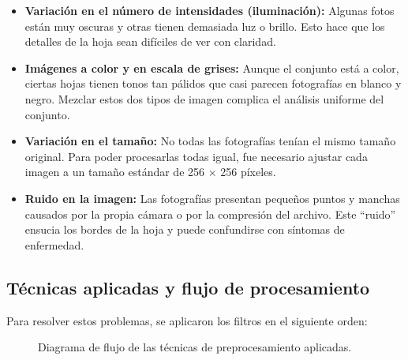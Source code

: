 \documentclass[11pt,a4paper]{article}
\begin{document}
\begin{itemize}
    \item \textbf{Variación en el número de intensidades (iluminación):} Algunas fotos
    están muy oscuras y otras tienen demasiada luz o brillo. Esto hace que los detalles
    de la hoja sean difíciles de ver con claridad.

    \item \textbf{Imágenes a color y en escala de grises:} Aunque el conjunto está a color,
    ciertas hojas tienen tonos tan pálidos que casi parecen fotografías en blanco y negro.
    Mezclar estos dos tipos de imagen complica el análisis uniforme del conjunto.

    \item \textbf{Variación en el tamaño:} No todas las fotografías tenían el mismo tamaño
    original. Para poder procesarlas todas igual, fue necesario ajustar cada imagen a un
    tamaño estándar de 256 $\times$ 256 píxeles.

    \item \textbf{Ruido en la imagen:} Las fotografías presentan pequeños puntos y manchas
    causados por la propia cámara o por la compresión del archivo. Este ``ruido'' ensucia
    los bordes de la hoja y puede confundirse con síntomas de enfermedad.
\end{itemize}

\subsection{Técnicas aplicadas y flujo de procesamiento}

Para resolver estos problemas, se aplicaron los filtros en el siguiente orden:

\begin{figure}[H]
    \centering
    \caption{Diagrama de flujo de las técnicas de preprocesamiento aplicadas.}
    \label{fig:flowchart}
\end{figure}
\end{document}
